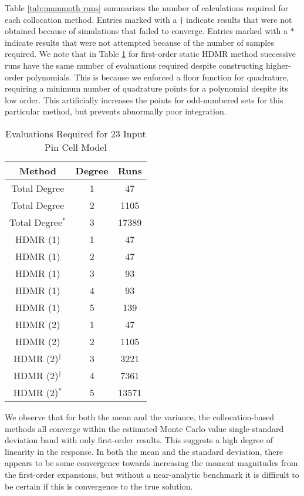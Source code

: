 Table \ref{tab:mammoth
runs} summarizes the number of calculations required for each collocation method.  Entries marked with a
$\dagger$ indicate results that were not obtained because of \mammoth{} simulations that failed to converge.
Entries marked with a $*$ indicate results that were not attempted because of the number of samples required.
We note that in Table \ref{tab:mammoth} for first-order static HDMR method successive runs have the same
number of evaluations required despite constructing higher-order polynomials.  This is because we enforced a
floor function for quadrature, requiring a minimum number of quadrature points for a polynomial despite its
low order.  This
artificially increases the points for odd-numbered sets for this particular method, but prevents abnormally
poor integration.
\begin{table}
  \centering
  \begin{tabular}{c c|c}
    Method & Degree & Runs \\ \hline
    Total Degree & 1 & 47 \\
    Total Degree & 2 & 1105 \\
    Total Degree$^*$ & 3 & 17389 \\ \hline
    HDMR (1) & 1 & 47 \\
    HDMR (1) & 2 & 47 \\
    HDMR (1) & 3 & 93 \\
    HDMR (1) & 4 & 93 \\
    HDMR (1) & 5 & 139\\ \hline
    HDMR (2) & 1 & 47 \\
    HDMR (2) & 2 & 1105 \\
    HDMR (2)$^\dagger$ & 3 & 3221 \\
    HDMR (2)$^\dagger$ & 4 & 7361 \\
    HDMR (2)$^*$ & 5 & 13571 \\
  \end{tabular}
  \caption{Evaluations Required for 23 Input Pin Cell Model}
  \label{tab:mammoth}
\end{table}

We observe that for both the mean and the variance, the collocation-based methods all converge within the
estimated Monte Carlo value single-standard deviation band with only first-order results.  This suggests a
high degree of linearity in the response.  In both the mean and the standard deviation, there appears to be
some convergence towards increasing the moment magnitudes from the first-order expansions, but without a near-analytic
benchmark it is difficult to be certain if this is convergence to the true solution.  

